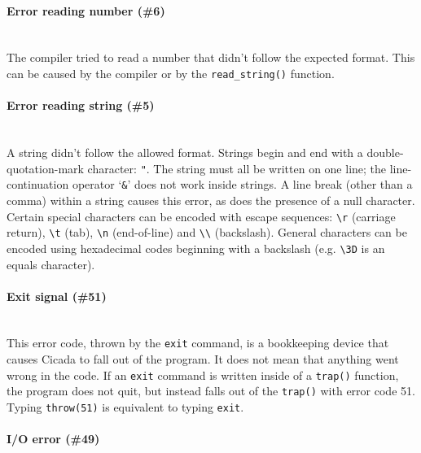 \documentclass{article}
\begin{document}
\paragraph{Error reading number (\#6)\\\\}

The compiler tried to read a number that didn't follow the expected format.  This can be caused by the compiler or by the \verb#read_string()# function.\\




\paragraph{Error reading string (\#5)\\\\}

A string didn't follow the allowed format.  Strings begin and end with a double-quotation-mark character:  \verb#"#.  The string must all be written on one line; the line-continuation operator `\verb#&#' does not work inside strings.  A line break (other than a comma) within a string causes this error, as does the presence of a null character.  Certain special characters can be encoded with escape sequences:  \verb#\r# (carriage return), \verb#\t# (tab), \verb#\n# (end-of-line) and \verb#\\# (backslash).  General characters can be encoded using hexadecimal codes beginning with a backslash (e.g. \verb#\3D# is an equals character).\\




\paragraph{Exit signal (\#51)\\\\}

This error code, thrown by the \verb#exit# command, is a bookkeeping device that causes Cicada to fall out of the program.  It does not mean that anything went wrong in the code.  If an \verb#exit# command is written inside of a \verb#trap()# function, the program does not quit, but instead falls out of the \verb#trap()# with error code 51.  Typing \verb#throw(51)# is equivalent to typing \verb#exit#.




\paragraph{I/O error (\#49)\\\\}
\end{document}
